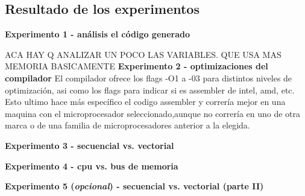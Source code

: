 \subsection{Resultado de los experimentos}

\vspace*{0.3cm} \noindent
\textbf{Experimento 1 - análisis el código generado}

ACA HAY Q ANALIZAR UN POCO LAS VARIABLES. QUE USA MAS MEMORIA BASICAMENTE
\vspace*{0.3cm} \noindent
\textbf{Experimento 2 - optimizaciones del compilador}
El compilador ofrece los flags -O1 a -03 para distintos niveles de optimizaci\'on, asi como los flags para indicar si es assembler de intel, amd, etc. 
Esto ultimo hace m\'as espec\'ifico el codigo assembler y correr\'ia mejor en una maquina con el microprocesador seleccionado,aunque no correr\'ia en uno de otra marca o de una familia de microprocesadores anterior a la elegida.

\vspace*{0.3cm} \noindent
\textbf{Experimento 3 - secuencial vs. vectorial}

\vspace*{0.3cm} \noindent
\textbf{Experimento 4 - cpu vs. bus de memoria}

\vspace*{0.3cm} \noindent
\textbf{Experimento 5 (\textit{opcional}) - secuencial vs. vectorial (parte II)}
